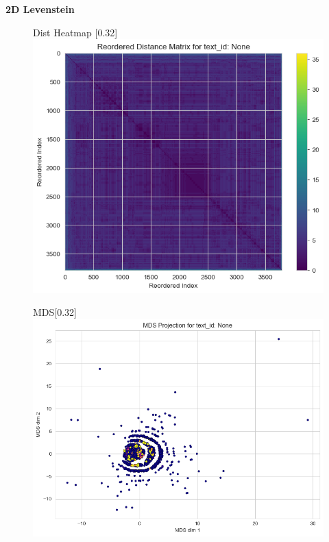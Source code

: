 \documentclass{article}
\begin{document}
\textbf{2D Levenstein}
\begin{figure}[H]
  \centering
  \begin{subcaptionbox}{Dist Heatmap \label{fig:sl_a}}[0.32\textwidth]
    {\centering\includegraphics[width=\linewidth]{plots/cluster_examples/hdbs_500examples_lev2D_trimmed_Boxplot.png}}
  \end{subcaptionbox}
  \hfill
  \begin{subcaptionbox}{MDS\label{fig:sl_b}}[0.32\textwidth]
    {\centering\includegraphics[width=\linewidth]{plots/cluster_examples/hdbs_500examples_lev2D_trimmed_MDS.png}}

\end{subcaptionbox}
\end{figure}
\end{document}
